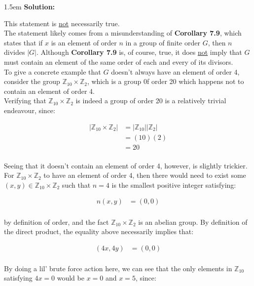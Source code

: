 \documentclass{article}
\newenvironment{solution}{
	\vspace{.5em}
	\par
	\begin{adjustwidth}{1.5em}{}
	\textbf{{Solution:}}
	\par
	\vspace{.5em}
}{
	\vspace{1em}
	\end{adjustwidth}
	\setcounter{step}{0}
}
\newcounter{step}
\newcommand{\dprod}[2]{\mathbb{Z}_{#1} \times \mathbb{Z}_{#2}}
\begin{document}
\begin{solution}
	This statement is \underline{not} necessarily true. \\

	The statement likely comes from a misunderstanding of \textbf{Corollary 7.9}, which states that if $x$ is an element of order $n$ in a group of finite order $G$, then $n$ divides $|G|$. Although \textbf{Corollary 7.9} is, of course, true, it does \underline{not} imply that $G$ must contain an element of the same order of each and every of its divisors. \\

	To give a concrete example that $G$ doesn't always have an element of order 4, consider the group $\dprod{10}{2}$, which is a group 0f order 20 which happens not to contain an element of order 4. \\

	Verifying that $\dprod{10}{2}$ is indeed a group of order 20 is a relatively trivial endeavour, since:

	\begin{align*}
		|\dprod{10}{2}| &= |\mathbb{Z}_{10}||\mathbb{Z}_{2}| \\
		&= (10)(2) \\
		&= 20 \\
	\end{align*}

	Seeing that it doesn't contain an element of order 4, however, is slightly trickier. For $\dprod{10}{2}$ to have an element of order 4, then there would need to exist some $(x, y) \in \dprod{10}{2}$ such that $n = 4$ is the smallest positive integer satisfying:

	\begin{align*}
		n(x, y) &= (0, 0) \\
	\end{align*}

	by definition of order, and the fact $\dprod{10}{2}$ is an abelian group. By definition of the direct product, the equality above necessarily implies that:

	\begin{align*}
		(4x, 4y) &= (0, 0) \\
	\end{align*}

	By doing a lil' brute force action here, we can see that the only elements in $\mathbb{Z}_{10}$ satisfying $4x = 0$ would be $x = 0$ and $x = 5$, since:

	\vspace{2em}


\end{solution}
\end{document}
